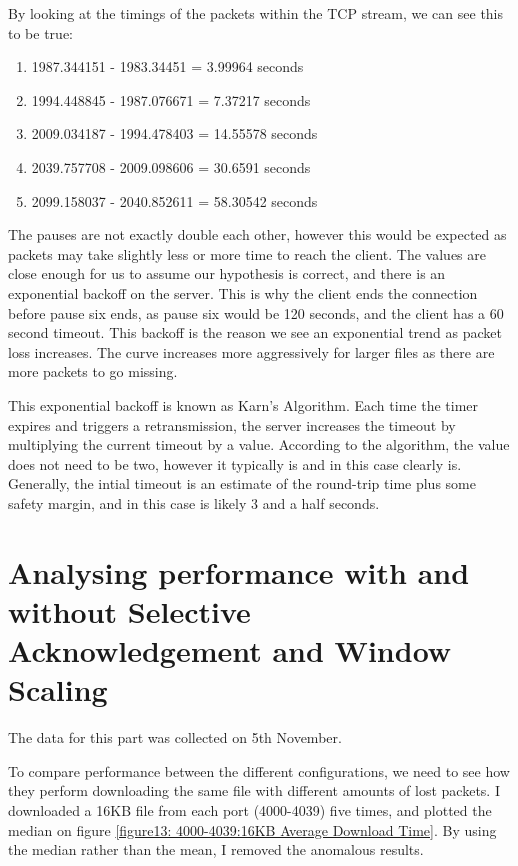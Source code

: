 \documentclass[12pt]{article}
\begin{document}
By looking at the timings of the packets within the TCP stream, we can see this to be true:
\begin{enumerate}
  \item 1987.344151 - 1983.34451 = 3.99964 seconds
  \item 1994.448845 - 1987.076671 = 7.37217 seconds
  \item 2009.034187 - 1994.478403 = 14.55578 seconds
  \item 2039.757708 - 2009.098606 = 30.6591 seconds
  \item 2099.158037 - 2040.852611 = 58.30542 seconds
\end{enumerate}

The pauses are not exactly double each other, however this would be expected as packets may take slightly less or more time to reach the client.
The values are close enough for us to assume our hypothesis is correct, and there is an exponential backoff on the server.
This is why the client ends the connection before pause six ends, as pause six would be 120 seconds, and the client has a 60 second timeout.
This backoff is the reason we see an exponential trend as packet loss increases.
The curve increases more aggressively for larger files as there are more packets to go missing.

This exponential backoff is known as Karn's Algorithm.
Each time the timer expires and triggers a retransmission, the server increases the timeout by multiplying the current timeout by a value.
According to the algorithm, the value does not need to be two, however it typically is and in this case clearly is.
Generally, the intial timeout is an estimate of the round-trip time plus some safety margin, and in this case is likely 3 and a half seconds.

\section{Analysing performance with and without Selective Acknowledgement and Window Scaling}
The data for this part was collected on 5th November.

To compare performance between the different configurations, we need to see how they perform downloading the same file with different amounts of lost packets.
I downloaded a 16KB file from each port (4000-4039) five times, and plotted the median on figure \ref{figure13: 4000-4039:16KB Average Download Time}.
By using the median rather than the mean, I removed the anomalous results.
\end{document}
